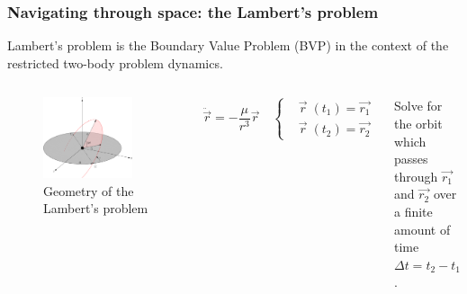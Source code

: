 \documentclass[xcolor={dvipsnames}]{beamer}
\begin{document}
\begin{frame}
\frametitle{Navigating through space: the Lambert's problem}

Lambert's problem is the Boundary Value Problem (BVP) in the context of the
restricted two-body problem dynamics.

\begin{columns}


    \begin{figure}[h]
        \centering
        \includegraphics[width=0.85\textwidth]{fig/lambert-problem/geometry.png}
        \caption{Geometry of the Lambert's problem}
        \label{fig:example_figure}
    \end{figure}
  

  $$\ddot{\vec{r}} = -\frac{\mu}{r^3}\vec{r} \quad \begin{cases}
     & \vec{r}\;(t_1) = \vec{r_1} \\ 
     & \vec{r}\;(t_2) = \vec{r_2}
     \end{cases}$$


\pause

\vspace{1cm}
Solve for the orbit which passes through $\vec{r_1}$ and $\vec{r_2}$ over a
finite amount of time $\Delta t = t_2 - t_1$.

\end{columns}

\end{frame}
\end{document}

